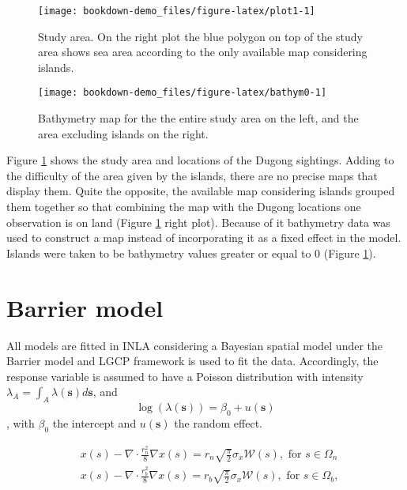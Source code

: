 \documentclass[
]{book}
\begin{document}
\begin{figure}
\texttt{[image: bookdown-demo\_files/figure-latex/plot1-1]} \caption{Study area. On the right plot the blue polygon on top of the study area shows sea area according to the only available map considering islands.}\label{fig:plot1}
\end{figure}

\begin{figure}
\texttt{[image: bookdown-demo\_files/figure-latex/bathym0-1]} \caption{Bathymetry map for the the entire study area on the left, and the area excluding islands on the right.}\label{fig:bathym0}
\end{figure}

Figure \ref{fig:plot1} shows the study area and locations of the Dugong sightings. Adding to the difficulty of the area given by the islands, there are no precise maps that display them. Quite the opposite, the available map considering islands grouped them together so that combining the map with the Dugong locations one observation is on land (Figure \ref{fig:plot1} right plot). Because of it bathymetry data was used to construct a map instead of incorporating it as a fixed effect in the model. Islands were taken to be bathymetry values greater or equal to \(0\) (Figure \ref{fig:plot1}).

\hypertarget{barrier-model}{%
\section{Barrier model}\label{barrier-model}}

All models are fitted in INLA considering a Bayesian spatial model under the Barrier model and LGCP framework \citep{bakka_non-stationary_2019, krainski_advanced_2018, simpson_going_2016} is used to fit the data. Accordingly, the response variable is assumed to have a Poisson distribution with intensity \(\lambda_A=\int_A \lambda(\mathbf{s}) d \mathbf{s}\), and \[\log (\lambda(\mathbf{s}))=\beta_0+u(\mathbf{s})\], with \(\beta_0\) the intercept and \(u(\mathbf{s})\) the random effect.

\[\begin{aligned}
& x(s)-\nabla \cdot \frac{r_n^2}{8} \nabla x(s)=r_n \sqrt{\frac{\pi}{2}} \sigma_x \mathcal{W}(s), \text { for } s \in \Omega_n \\
& x(s)-\nabla \cdot \frac{r_b^2}{8} \nabla x(s)=r_b \sqrt{\frac{\pi}{2}} \sigma_x \mathcal{W}(s), \text { for } s \in \Omega_b,
\end{aligned}\]
\end{document}
